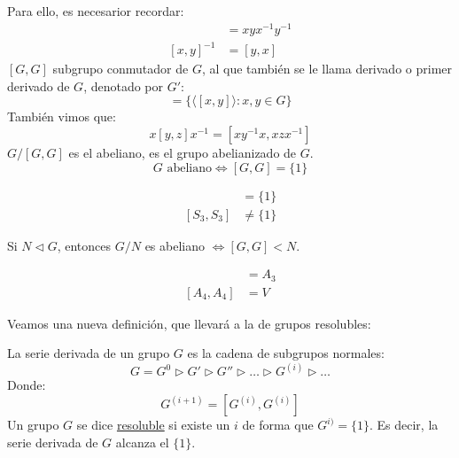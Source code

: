 Para ello, es necesarior recordar:
\begin{align*}
    [x,y] &= xyx^{-1}y^{-1} \\
    {[x,y]}^{-1} &= [y,x]
\end{align*}
$[G,G]$ subgrupo conmutador de $G$, al que también se le llama derivado o primer derivado de $G$, denotado por $G'$:
\begin{equation*}
    [G,G] = \{\langle [x,y] \rangle : x,y\in G\}
\end{equation*}
También vimos que:
\begin{equation*}
    x[y,z]x^{-1} = [xy^{-1}x, xzx^{-1}]
\end{equation*}
$G/[G,G]$ es el abeliano, es el grupo abelianizado de $G$.
\begin{equation*}
    G \text{\ abeliano} \Longleftrightarrow [G, G] = \{1\}
\end{equation*}
\begin{ejemplo}
    \begin{align*}
        [A_3, A_3] &= \{1\} \\
        [S_3, S_3] &\neq \{1\}
    \end{align*}
\end{ejemplo}
Si $N\lhd G$, entonces $G/N$ es abeliano $\Longleftrightarrow [G,G]<N$.
\begin{ejemplo}
    \begin{align*}
        [S_3,S_3] &= A_3 \\
        [A_4, A_4] &= V
    \end{align*}
\end{ejemplo}

Veamos una nueva definición, que llevará a la de grupos resolubles:
\begin{definicion}
    La serie derivada de un grupo $G$ es la cadena de subgrupos normales:
    \begin{equation*}
        G = G^0 \rhd G' \rhd G'' \rhd \ldots \rhd G^{(i)} \rhd \ldots
    \end{equation*}
    Donde:
    \begin{equation*}
        G^{(i+1)} = [G^{(i)}, G^{(i)}]
    \end{equation*}
    Un grupo $G$ se dice \underline{resoluble} si existe un $i$ de forma que $G^{i)} = \{1\}$. Es decir, la serie derivada de $G$ alcanza el $\{1\}$.
\end{definicion}

